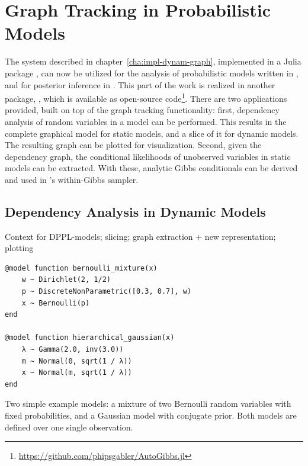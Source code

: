 \chapter{Graph Tracking in Probabilistic Models}
\label{cha:graph-track-prob}

The system described in chapter~\ref{cha:impl-dynam-graph}, implemented in a Julia package
\irtrackerjl{}, can now be utilized for the analysis of probabilistic models written in \dppljl{},
and for posterior inference in \turingjl{}.  This part of the work is realized in another package,
\autogibbsjl{}, which is available as open-source
code\footnote{\url{https://github.com/phipsgabler/AutoGibbs.jl}}.  There are two applications
provided, built on top of the graph tracking functionality: first, dependency analysis of random
variables in a model can be performed.  This results in the complete graphical model for static
models, and a slice of it for dynamic models.  The resulting graph can be plotted for visualization.
Second, given the dependency graph, the conditional likelihoods of unobserved variables in static
models can be extracted.  With these, analytic Gibbs conditionals can be derived and used in
\turingjl{}'s within-Gibbs sampler.

\section{Dependency Analysis in Dynamic Models}
\label{sec:depend-analysis}

Context for DPPL-models; slicing; graph extraction + new representation; plotting

\begin{lstfloat}[t]
\begin{lstlisting}[style=lstfloat]
@model function bernoulli_mixture(x)
    w ~ Dirichlet(2, 1/2)
    p ~ DiscreteNonParametric([0.3, 0.7], w)
    x ~ Bernoulli(p)
end

@model function hierarchical_gaussian(x)
    λ ~ Gamma(2.0, inv(3.0))
    m ~ Normal(0, sqrt(1 / λ))
    x ~ Normal(m, sqrt(1 / λ))
end
\end{lstlisting}
  \caption{Two simple example models: a mixture of two Bernoulli random variables with fixed
    probabilities, and a Gaussian model with conjugate prior.  Both models are defined over one
    single observation.}
  \label{lst:dependency-examples}
\end{lstfloat}

